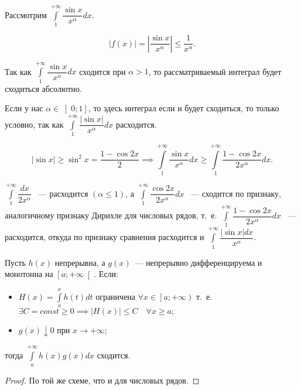 \documentclass[../../main.tex]{subfiles}
\begin{document}
\begin{exmp}
 Рассмотрим $\displaystyle\int\limits_{1}^{+\infty} 
 \dfrac{\sin{x}}{x^{\alpha}}dx$.
 
 \[\left| f(x) \right| = \left| \dfrac{\sin{x}}{x^{\alpha}}\right| \leq 
 \dfrac{1}{x^{\alpha}}.\]
 
 Так как $\displaystyle\int\limits_{1}^{+\infty} 
 \dfrac{\sin{x}}{x^{\alpha}}dx$ сходится при $\alpha  > 1$, то 
 рассматриваемый интеграл будет сходиться абсолютно.
 
 Если у нас $\alpha \in \left]0; 1 \right]$, то здесь интеграл если и будет 
 сходиться, то только условно, так как 
 $\displaystyle\int\limits_{1}^{+\infty}\dfrac{\left| 
 \sin{x}\right|}{x^{\alpha}}dx$ расходится.
 
 \[\left| \sin{x} \right| \geq \sin^2{x} = \dfrac{1-\cos{2x}}{2} \implies 
 \int\limits_{1}^{+\infty} \dfrac{\sin{x}}{x^{\alpha}}dx \geq 
 \int\limits_{1}^{+\infty} \dfrac{1 - \cos{2x}}{2x^{\alpha}}dx.\]
 
 $\displaystyle\int\limits_{1}^{+\infty} \dfrac{dx}{2x^{\alpha}}$ ~--- 
 расходится $(\alpha \leq 1)$, а $\displaystyle\int\limits_{1}^{+\infty} 
 \dfrac{\cos{2x}}{2x^{\alpha}}dx$ ~--- сходится по признаку, аналогичному 
 признаку Дирихле для числовых рядов, т.~е. 
 $\displaystyle\int\limits_{1}^{+\infty} \dfrac{1 - \cos{2x}}{2x^{\alpha}}dx$ 
 ~--- расходится, откуда по признаку сравнения расходится и 
 $\displaystyle\int\limits_{1}^{+\infty} \dfrac{|\sin x|dx}{x^{\alpha}}$.
\end{exmp}

\begin{theorem}
 Пусть $h(x)$ непрерывна, а $g(x)$~--- непрерывно дифференцируема и монотонна 
 на 
 $\left[a; +\infty\right[$.
Если:
\begin{itemize}
\item[а)] $H(x) = \displaystyle\int\limits_{a}^{x}h(t)dt$ ограничена $\forall 
x \in 
\left[a; +\infty \right)$ т.~е. $\exists C = const \geq 0 \implies {\left| 
H(x) 
\right| \leq C} \quad {\forall x \geq a};$

\item[б)] $g(x) \downarrow 0$ при $x \to +\infty$;
\end{itemize}
тогда $\displaystyle\int\limits_{a}^{+\infty}h(x)g(x)dx$ сходится.
\end{theorem}
\begin{proof}
 По той же схеме, что и для числовых рядов.
\end{proof}
\end{document}
